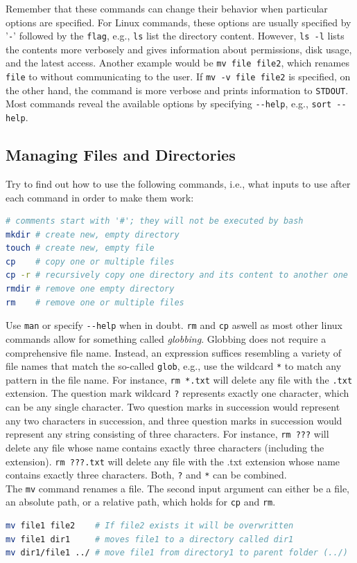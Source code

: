 \documentclass[9pt,tutorial]{livecoms}
\newcommand{\code}[1]{\colorbox{light-gray}{\texttt{#1}}}
\begin{document}
Remember that these commands can change their behavior when particular options are specified. For Linux commands, these options are usually specified by '\code{-}' followed by the \texttt{flag}, e.g., \code{ls} list the directory content. However, \code{ls -l} lists the contents more verbosely and gives information about permissions, disk usage, and the latest access. Another example would be \code{mv file file2}, which renames \texttt{file} to  without communicating to the user. If \code{mv -v file file2} is specified, on the other hand, the command is more verbose and prints information to \texttt{STDOUT}. Most commands reveal the available options by specifying \code{-{}-help}, e.g., \code{sort -{}-help}.


\subsection*{Managing Files and Directories}
Try to find out how to use the following commands, i.e., what inputs to use after each command in order to make them work:
\begin{lstlisting}[language=bash]
# comments start with '#'; they will not be executed by bash
mkdir # create new, empty directory
touch # create new, empty file
cp    # copy one or multiple files
cp -r # recursively copy one directory and its content to another one
rmdir # remove one empty directory
rm    # remove one or multiple files
\end{lstlisting}
Use \code{man} or specify \code{-{}-help} when in doubt. \code{rm} and \code{cp} aswell as most other linux commands allow for something called \textit{globbing}. Globbing does not require a comprehensive file name. Instead, an expression suffices resembling a variety of file names that match the so-called \texttt{glob}, e.g., use the wildcard \code{*} to match any pattern in the file name. For instance, \code{rm *.txt} will delete any file with the \texttt{.txt} extension. The question mark wildcard \code{?} represents exactly one character, which can be any single character. Two question marks in succession would represent any two characters in succession, and three question marks in succession would represent any string consisting of three characters. For instance, \code{rm ???} will delete any file whose name contains exactly three characters (including the extension). \code{rm ???.txt} will delete any file with the .txt extension whose name contains exactly three characters. Both, \code{?} and \code{*} can be combined.\\
The \code{mv} command renames a file. The second input argument can either be a file, an absolute path, or a relative path, which holds for \code{cp} and \code{rm}.
\begin{lstlisting}[language=bash]
mv file1 file2    # If file2 exists it will be overwritten
mv file1 dir1     # moves file1 to a directory called dir1
mv dir1/file1 ../ # move file1 from directory1 to parent folder (../)
\end{lstlisting}
\end{document}
